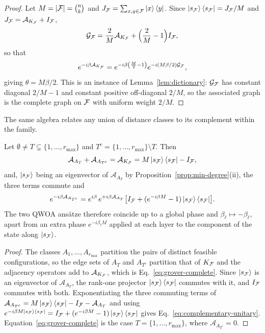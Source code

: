 {\begin{proof}
Let $M=|\mathcal{F}|=\binom{n}{k}$ and $J_{\mathcal{F}}=\sum_{x,y\in\mathcal{F}}\ket{x}\bra{y}$. Since $\ket{s_{\mathcal{F}}}\bra{s_{\mathcal{F}}}=J_{\mathcal{F}}/M$ and $J_{\mathcal{F}}=\mathcal{A}_{K_{\mathcal{F}}}+I_{\mathcal{F}}$,
\begin{equation}
\mathcal{G}_{\mathcal{F}} = \frac{2}{M}\mathcal{A}_{K_{\mathcal{F}}} +\Bigl(\frac{2}{M}-1\Bigr)I_{\mathcal{F}},
\end{equation}
so that
\begin{equation}
e^{-i\beta \mathcal{A}_{K_{\mathcal{F}}}} = e^{-i\beta\left(\frac{M}{2}-1\right)} e^{-i(M\beta/2)\mathcal{G}_{\mathcal{F}}},
    \label{eq:grover-rescaling}
\end{equation}
giving $\theta=M\beta/2$. This is an instance of Lemma~\ref{lem:dictionary}: $\mathcal{G}_{\mathcal{F}}$ has constant diagonal $2/M-1$ and constant positive off-diagonal $2/M$, so the associated graph is the complete graph on $\mathcal{F}$ with uniform weight $2/M$.
\end{proof}

The same algebra relates any union of distance classes to its complement within the family.

\begin{proposition}
\label{prop:complementary}
Let $\emptyset\neq T\subsetneq\{1,\dots,r_{\max}\}$ and $T^{c}=\{1,\dots,r_{\max}\}\setminus T$. Then
\begin{equation}
\mathcal{A}_{A_T}+\mathcal{A}_{A_{T^{c}}} = \mathcal{A}_{K_{\mathcal{F}}} = M\ket{s_{\mathcal{F}}}\bra{s_{\mathcal{F}}}-I_{\mathcal{F}} ,
    \label{eq:complementary-sum}
\end{equation}
and, $\ket{s_{\mathcal{F}}}$ being an eigenvector of $\mathcal{A}_{A_T}$ by Proposition~\ref{prop:min-degree}(ii), the three terms commute and
\begin{equation}
e^{-i\beta\mathcal{A}_{A_{T^{c}}}} = e^{i\beta}\,e^{+i\beta\mathcal{A}_{A_T}} \bigl[I_{\mathcal{F}}+(e^{-i\beta M}-1)\ket{s_{\mathcal{F}}}\bra{s_{\mathcal{F}}}\bigr] .
    \label{eq:complementary-unitary}
\end{equation}
The two QWOA ans\"atze therefore coincide up to a global phase and $\beta_\ell\mapsto-\beta_\ell$, apart from an extra phase $e^{-i\beta_\ell M}$ applied at each layer to the component of the state along $\ket{s_{\mathcal{F}}}$.
\end{proposition}

\begin{proof}
The classes $A_1,\dots,A_{r_{\max}}$ partition the pairs of distinct feasible configurations, so the edge sets of $A_T$ and $A_{T^{c}}$ partition that of $K_{\mathcal{F}}$ and the adjacency operators add to $\mathcal{A}_{K_{\mathcal{F}}}$, which is Eq.~\eqref{eq:grover-complete}. Since $\ket{s_{\mathcal{F}}}$ is an eigenvector of $\mathcal{A}_{A_T}$, the rank-one projector $\ket{s_{\mathcal{F}}}\bra{s_{\mathcal{F}}}$ commutes with it, and $I_{\mathcal{F}}$ commutes with both. Exponentiating the three commuting terms of $\mathcal{A}_{A_{T^{c}}}=M\ket{s_{\mathcal{F}}}\bra{s_{\mathcal{F}}}-I_{\mathcal{F}}-\mathcal{A}_{A_T}$ and using $e^{-i\beta M\ket{s_{\mathcal{F}}}\bra{s_{\mathcal{F}}}} =I_{\mathcal{F}}+(e^{-i\beta M}-1)\ket{s_{\mathcal{F}}}\bra{s_{\mathcal{F}}}$ gives Eq.~\eqref{eq:complementary-unitary}. Equation~\eqref{eq:grover-complete} is the case $T=\{1,\dots,r_{\max}\}$, where $\mathcal{A}_{A_{T^{c}}}=0$.
\end{proof}

}
